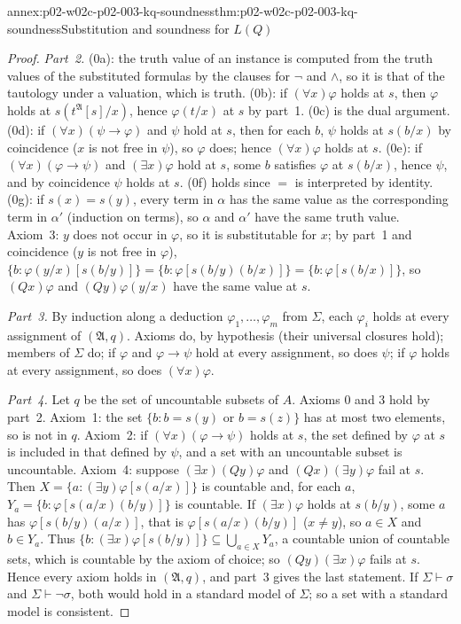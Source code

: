 \begin{annexitem}{annex:p02-w02c-p02-003-kq-soundness}{thm:p02-w02c-p02-003-kq-soundness}{Substitution and soundness for \(L(Q)\)}
\begin{proof}
\emph{Part~2.}  (0a): the truth value of an instance is computed from the
truth values of the substituted formulas by the clauses for \(\neg\) and
\(\land\), so it is that of the tautology under a valuation, which is
truth.  (0b): if \((\forall x)\varphi\) holds at \(s\), then \(\varphi\)
holds at \(s(t^{\mathfrak A}[s]/x)\), hence \(\varphi(t/x)\) at \(s\) by
part~1.  (0c) is the dual argument.  (0d): if \((\forall x)(\psi\to\varphi)\)
and \(\psi\) hold at \(s\), then for each \(b\), \(\psi\) holds at
\(s(b/x)\) by coincidence (\(x\) is not free in \(\psi\)), so \(\varphi\)
does; hence \((\forall x)\varphi\) holds at \(s\).  (0e): if
\((\forall x)(\varphi\to\psi)\) and \((\exists x)\varphi\) hold at \(s\),
some \(b\) satisfies \(\varphi\) at \(s(b/x)\), hence \(\psi\), and by
coincidence \(\psi\) holds at \(s\).  (0f) holds since \(=\) is interpreted
by identity.  (0g): if \(s(x)=s(y)\), every term in \(\alpha\) has the same
value as the corresponding term in \(\alpha'\) (induction on terms), so
\(\alpha\) and \(\alpha'\) have the same truth value.  Axiom~3: \(y\) does
not occur in \(\varphi\), so it is substitutable for \(x\); by part~1 and
coincidence (\(y\) is not free in \(\varphi\)),
\(\{b:\varphi(y/x)[s(b/y)]\}=\{b:\varphi[s(b/y)(b/x)]\}=\{b:\varphi[s(b/x)]\}\),
so \((Qx)\varphi\) and \((Qy)\varphi(y/x)\) have the same value at \(s\).

\emph{Part~3.}  By induction along a deduction \(\varphi_1,\ldots,\varphi_m\)
from \(\Sigma\), each \(\varphi_i\) holds at every assignment of
\((\mathfrak A,q)\).  Axioms do, by hypothesis (their universal closures
hold); members of \(\Sigma\) do; if \(\varphi\) and \(\varphi\to\psi\)
hold at every assignment, so does \(\psi\); if \(\varphi\) holds at every
assignment, so does \((\forall x)\varphi\).

\emph{Part~4.}  Let \(q\) be the set of uncountable subsets of \(A\).
Axioms 0 and 3 hold by part~2.  Axiom~1: the set
\(\{b:b=s(y)\text{ or }b=s(z)\}\) has at most two elements, so is not in
\(q\).  Axiom~2: if \((\forall x)(\varphi\to\psi)\) holds at \(s\), the set
defined by \(\varphi\) at \(s\) is included in that defined by \(\psi\), and
a set with an uncountable subset is uncountable.  Axiom~4: suppose
\((\exists x)(Qy)\varphi\) and \((Qx)(\exists y)\varphi\) fail at \(s\).
Then \(X=\{a:(\exists y)\varphi[s(a/x)]\}\) is countable and, for each
\(a\), \(Y_a=\{b:\varphi[s(a/x)(b/y)]\}\) is countable.  If
\((\exists x)\varphi\) holds at \(s(b/y)\), some \(a\) has
\(\varphi[s(b/y)(a/x)]\), that is \(\varphi[s(a/x)(b/y)]\) (\(x\neq y\)),
so \(a\in X\) and \(b\in Y_a\).  Thus
\(\{b:(\exists x)\varphi[s(b/y)]\}\subseteq\bigcup_{a\in X}Y_a\), a
countable union of countable sets, which is countable by the axiom of
choice; so \((Qy)(\exists x)\varphi\) fails at \(s\).  Hence every axiom
holds in \((\mathfrak A,q)\), and part~3 gives the last statement.  If
\(\Sigma\vdash\sigma\) and \(\Sigma\vdash\neg\sigma\), both would hold in a
standard model of \(\Sigma\); so a set with a standard model is consistent.
\end{proof}
\end{annexitem}

